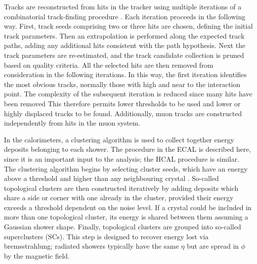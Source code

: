 Tracks are reconstructed from hits in the tracker using multiple iterations of a combinatorial track-finding procedure \cite{TrackReco}.
Each iteration proceeds in the following way.
First, track seeds comprising two or three hits are chosen, defining the initial track parameters.
Then an extrapolation is performed along the expected track paths, adding any additional hits consistent with the path hypothesis.
Next the track parameters are re-estimated, and the track candidate collection is pruned based on quality criteria.
All the selected hits are then removed from consideration in the following iterations.
In this way, the first iteration identifies the most obvious tracks, normally those with high \pt and near to the interaction point.
The complexity of the subsequent iteration is reduced since many hits have been removed
This therefore permits lower thresholds to be used and lower \pt or highly displaced tracks to be found.
Additionally, muon tracks are constructed independently from hits in the muon system.

In the calorimeters, a clustering algorithm is used to collect together energy deposits belonging to each shower. %
The procedure in the ECAL is described here, since it is an important input to the \Hgg analysis; the HCAL procedure is similar.
The clustering algorithm begins by selecting cluster seeds, which have an energy above a threshold and higher than any neighbouring crystal \cite{PhotonReco}.
So-called topological clusters are then constructed iteratively by adding deposits which share a side or corner with one already in the cluster, 
provided their energy exceeds a threshold dependent on the noise level. %
If a crystal could be included in more than one topological cluster, its energy is shared between them assuming a Gaussian shower shape.
Finally, topological clusters are grouped into so-called superclusters (SCs).
This step is designed to recover energy lost via bremsstrahlung; 
radiated showers typically have the same $\eta$ but are spread in $\phi$ by the magnetic field.

